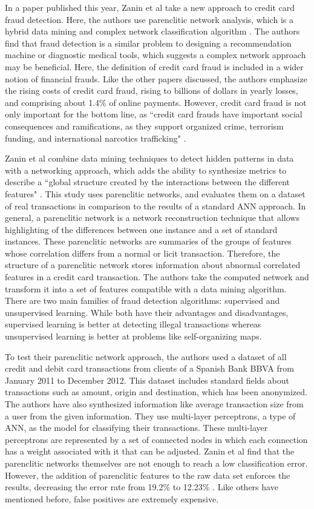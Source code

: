 \documentclass[midd]{thesis}
\begin{document}
In a paper published this year, Zanin et al take a new approach to credit card fraud detection. Here, the authors use parenclitic network analysis, which is a hybrid data mining and complex network classification algorithm \cite{Zanin2018}. The authors find that fraud detection is a similar problem to designing a recommendation machine or diagnostic medical tools, which suggests a complex network approach may be beneficial. Here, the definition of credit card fraud is included in a wider notion of financial frauds. Like the other papers discussed, the authors emphasize the rising costs of credit card fraud, rising to billions of dollars in yearly losses, and comprising about 1.4\% of online payments. However, credit card fraud is not only important for the bottom line, as ``credit card frauds have important social consequences and ramifications, as they support organized crime, terrorism funding, and international narcotics trafficking" \cite{Zanin2018}. 

Zanin et al combine data mining techniques to detect hidden patterns in data with a networking approach, which adds the ability to synthesize metrics to describe a ``global structure created by the interactions between the different features" \cite{Zanin2018}. This study uses parenclitic networks, and evaluates them on a dataset of real transactions in comparison to the results of a standard ANN approach. In general, a parenclitic network is a network reconstruction technique that allows highlighting of the differences between one instance and a set of standard instances. These parenclitic networks are summaries of the groups of features whose correlation differs from a normal or licit transaction. Therefore, the structure of a parenclitic network stores information about abnormal correlated features in a credit card transaction. The authors take the computed network and transform it into a set of features compatible with a data mining algorithm. There are two main families of fraud detection algorithms: supervised and unsupervised learning. While both have their advantages and disadvantages, supervised learning is better at detecting illegal transactions whereas unsupervised learning is better at problems like self-organizing maps.

To test their parenclitic network approach, the authors used a dataset of all credit and debit card transactions from clients of a Spanish Bank BBVA from January 2011 to December 2012. This dataset includes standard fields about transactions such as amount, origin and destination, which has been anonymized. The authors have also synthesized information like average transaction size from a user from the given information. They use multi-layer perceptrons, a type of ANN, as the model for classifying their transactions. These multi-layer perceptrons are represented by a set of connected nodes in which each connection has a weight associated with it that can be adjusted. Zanin et al find that the parenclitic networks themselves are not enough to reach a low classification error. However, the addition of parenclitic features to the raw data set enforces the results, decreasing the error rate from 19.2\% to 12.23\% \cite{Zanin2018}. Like others have mentioned before, false positives are extremely expensive.
\end{document}
